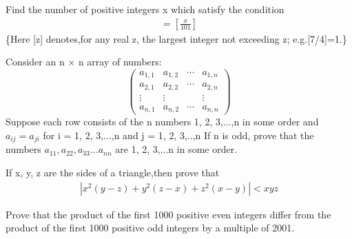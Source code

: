 \item Find the number of positive integers x which satisfy the condition
\begin{align*}
[\frac{x}{99}]=[\frac{x}{101}]
\end{align*}
\{Here [z] denotes,for any real z, the largest integer not exceeding z; e.g.[7/4]=1.\}

\item Consider an n $\times$ n array of numbers:
\begin{equation*}
\begin{pmatrix}
a_{1,1} & a_{1,2} & \cdots & a_{1,n} \\
a_{2,1} & a_{2,2} & \cdots & a_{2,n} \\
\vdots  & \vdots  & & \vdots  \\
a_{n,1} & a_{n,2} & \cdots & a_{n,n} 
\end{pmatrix}
\end{equation*}
Suppose each row consists of the n numbers 1, 2, 3,...,n in some order and $a_{ij} = a_{ji}$ for i = 1, 2, 3,...,n and j = 1, 2, 3,..,n If n is odd, prove that the numbers $a_{11}, a_{22}, a_{33}...a_{nn}$ are 1, 2, 3,...n in some order.

\item If x, y, z are the sides of a triangle,then prove that 
\begin{align*}
|x^2(y-z)+y^2(z-x)+z^2(x-y)| < xyz
\end{align*}

\item Prove that the product of the first 1000 positive even integers differ from the product of the first 1000 positive odd integers by a multiple of 2001.
